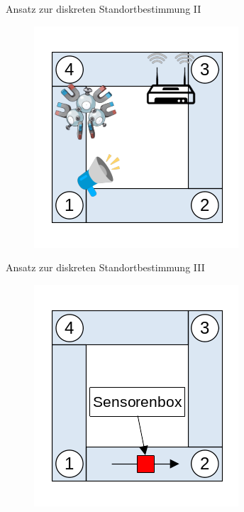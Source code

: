 \documentclass[10pt]{beamer}
\begin{document}
\begin{frame}{Ansatz zur diskreten Standortbestimmung II}
    \begin{figure}
        \centering
        \includegraphics[width=0.6\linewidth]{model/grundlegender_ansatz_2.png}
    \end{figure}
\end{frame}

\begin{frame}{Ansatz zur diskreten Standortbestimmung III}
    \begin{figure}
        \centering
        \includegraphics[width=0.6\linewidth]{model/grundlegender_ansatz.png}
    \end{figure}
\end{frame}
\end{document}
